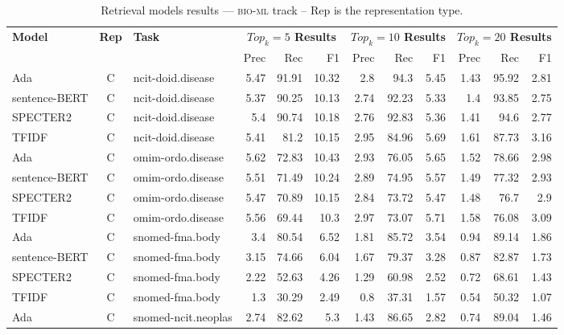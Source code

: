 
    \begin{table}[h]
         \centering
         \caption{Retrieval models results --- \textsc{bio-ml} track -- Rep is the representation type.} \label{tab:ir_bio-ml}
         \begin{tabular}{|l|c|l|r|r|r|r|r|r|r|r|r|}
             \hline
             \multirow{2}{*}{\textbf{Model}}  & \multirow{2}{*}{\textbf{Rep}}  & \multirow{2}{*}{\textbf{Task}} &  \multicolumn{3}{c|}{\textbf{$Top_k=5$ Results}} &  \multicolumn{3}{c|}{\textbf{$Top_k=10$ Results}} &  \multicolumn{3}{c|}{\textbf{$Top_k=20$ Results}}\\
             \cline{4-12}
              & & & Prec & Rec & F1& Prec & Rec & F1& Prec & Rec & F1 \\
             \hline
    	Ada  & C & ncit-doid.disease  & 5.47 & 91.91 & 10.32 & 2.8 & 94.3 & 5.45 & 1.43 & 95.92 & 2.81\\
	sentence-BERT  & C & ncit-doid.disease  & 5.37 & 90.25 & 10.13 & 2.74 & 92.23 & 5.33 & 1.4 & 93.85 & 2.75\\
	SPECTER2  & C & ncit-doid.disease  & 5.4 & 90.74 & 10.18 & 2.76 & 92.83 & 5.36 & 1.41 & 94.6 & 2.77\\
	TFIDF  & C & ncit-doid.disease  & 5.41 & 81.2 & 10.15 & 2.95 & 84.96 & 5.69 & 1.61 & 87.73 & 3.16\\
	\hline
	Ada  & C & omim-ordo.disease  & 5.62 & 72.83 & 10.43 & 2.93 & 76.05 & 5.65 & 1.52 & 78.66 & 2.98\\
	sentence-BERT  & C & omim-ordo.disease  & 5.51 & 71.49 & 10.24 & 2.89 & 74.95 & 5.57 & 1.49 & 77.32 & 2.93\\
	SPECTER2  & C & omim-ordo.disease  & 5.47 & 70.89 & 10.15 & 2.84 & 73.72 & 5.47 & 1.48 & 76.7 & 2.9\\
	TFIDF  & C & omim-ordo.disease  & 5.56 & 69.44 & 10.3 & 2.97 & 73.07 & 5.71 & 1.58 & 76.08 & 3.09\\
	\hline
	Ada  & C & snomed-fma.body  & 3.4 & 80.54 & 6.52 & 1.81 & 85.72 & 3.54 & 0.94 & 89.14 & 1.86\\
	sentence-BERT  & C & snomed-fma.body  & 3.15 & 74.66 & 6.04 & 1.67 & 79.37 & 3.28 & 0.87 & 82.87 & 1.73\\
	SPECTER2  & C & snomed-fma.body  & 2.22 & 52.63 & 4.26 & 1.29 & 60.98 & 2.52 & 0.72 & 68.61 & 1.43\\
	TFIDF  & C & snomed-fma.body  & 1.3 & 30.29 & 2.49 & 0.8 & 37.31 & 1.57 & 0.54 & 50.32 & 1.07\\
	\hline
	Ada  & C & snomed-ncit.neoplas  & 2.74 & 82.62 & 5.3 & 1.43 & 86.65 & 2.82 & 0.74 & 89.04 & 1.46\\

\end{tabular}
\end{table}
